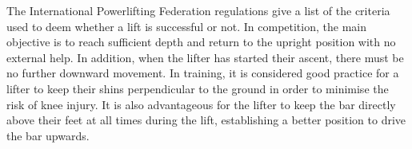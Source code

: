 The International Powerlifting Federation regulations\cite{ipf} give a list of the criteria used to deem whether a lift is successful or not. In competition, the main objective is to reach sufficient depth and return to the upright position with no external help. In addition, when the lifter has started their ascent, there must be no further downward movement. In training, it is considered good practice for a lifter to keep their shins perpendicular to the ground in order to minimise the risk of knee injury. It is also advantageous for the lifter to keep the bar directly above their feet at all times during the lift, establishing a better position to drive the bar upwards.
